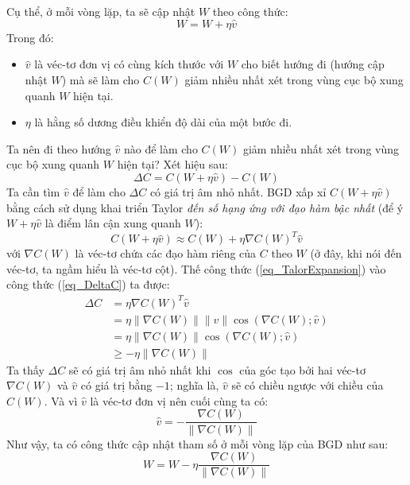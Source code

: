 Cụ thể, ở mỗi vòng lặp, ta sẽ cập nhật $W$ theo công thức:
\begin{equation}
	W = W + \eta \hat{v}
\end{equation}
Trong đó:
\begin{itemize}
	\item $\hat{v}$ là véc-tơ đơn vị có cùng kích thước với $W$ cho biết hướng đi (hướng cập nhật $W $) mà sẽ làm cho $C(W)$ giảm nhiều nhất xét trong vùng cục bộ xung quanh $W$ hiện tại.
	\item $\eta$ là hằng số dương điều khiển độ dài của một bước đi.
\end{itemize}
Ta nên đi theo hướng $\hat{v}$ nào để làm cho $C(W)$ giảm nhiều nhất xét trong vùng cục bộ xung quanh $W$ hiện tại? Xét hiệu sau:
\begin{equation}
	\Delta C = C(W + \eta \hat{v}) - C(W)
	\label{eq_DeltaC}
\end{equation}
Ta cần tìm $\hat{v}$ để làm cho $\Delta C$ có giá trị âm nhỏ nhất. BGD xấp xỉ $C(W + \eta \hat{v})$ bằng cách sử dụng khai triển Taylor \emph{đến số hạng ứng với đạo hàm bậc nhất} (để ý $W + \eta \hat{v}$ là điểm lân cận xung quanh $W$):
\begin{equation}
	C(W + \eta \hat{v}) \approx C(W) + \eta \nabla C(W)^T \hat{v}
	\label{eq_TalorExpansion}
\end{equation}
với $\nabla C(W)$ là véc-tơ chứa các đạo hàm riêng của $C$ theo $W$ (ở đây, khi nói đến véc-tơ, ta ngầm hiểu là véc-tơ cột). Thế công thức (\ref{eq_TalorExpansion}) vào công thức (\ref{eq_DeltaC}) ta được:
\begin{equation}
\begin{split}
	\Delta C &= \eta \nabla C(W)^T \hat{v}\\
			 &= \eta \|\nabla C(W)\|\|\hat{v}\|\cos \left(\nabla C(W);\hat{v}\right)\\
			 &= \eta \|\nabla C(W)\|\cos \left(\nabla C(W);\hat{v}\right)\\
			 &\geq - \eta \|\nabla C(W)\|
\end{split}
\end{equation}
Ta thấy $\Delta C$ sẽ có giá trị âm nhỏ nhất khi $\cos$ của góc tạo bởi hai véc-tơ $\nabla C(W)$ và $\hat{v}$ có giá trị bằng $-1$; nghĩa là, $\hat{v}$ sẽ có chiều ngược với chiều của $C(W)$. Và vì $\hat{v}$ là véc-tơ đơn vị nên cuối cùng ta có:
\begin{equation}
	\hat{v} = -\frac{\nabla C(W)}{\|\nabla C(W)\|}
\end{equation}
Như vậy, ta có công thức cập nhật tham số ở mỗi vòng lặp của BGD như sau:
\begin{equation}
	W = W -\eta \frac{\nabla C(W)}{\|\nabla C(W)\|}
	\label{eq_UpdateW_FixedStep}
\end{equation}

